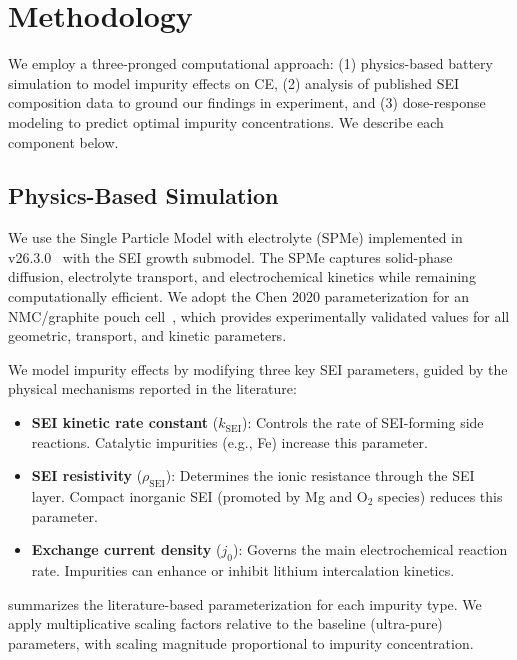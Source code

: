 \section{Methodology}
\label{sec:method}

We employ a three-pronged computational approach: (1) physics-based battery simulation to model impurity effects on CE, (2) analysis of published SEI composition data to ground our findings in experiment, and (3) dose-response modeling to predict optimal impurity concentrations. We describe each component below.

\subsection{Physics-Based Simulation}
\label{sec:simulation}

We use the Single Particle Model with electrolyte (SPMe) implemented in \pybamm v26.3.0~\citep{pybamm2020} with the SEI growth submodel. The SPMe captures solid-phase diffusion, electrolyte transport, and electrochemical kinetics while remaining computationally efficient. We adopt the Chen 2020 parameterization for an NMC/graphite pouch cell~\citep{chen2020parameterization}, which provides experimentally validated values for all geometric, transport, and kinetic parameters.

We model impurity effects by modifying three key SEI parameters, guided by the physical mechanisms reported in the literature:

\begin{itemize}[leftmargin=*,itemsep=2pt,topsep=2pt]
    \item \textbf{SEI kinetic rate constant} ($k_\text{SEI}$): Controls the rate of SEI-forming side reactions. Catalytic impurities (e.g., Fe) increase this parameter.
    \item \textbf{SEI resistivity} ($\rho_\text{SEI}$): Determines the ionic resistance through the SEI layer. Compact inorganic SEI (promoted by Mg and O$_2$ species) reduces this parameter.
    \item \textbf{Exchange current density} ($j_0$): Governs the main electrochemical reaction rate. Impurities can enhance or inhibit lithium intercalation kinetics.
\end{itemize}

 summarizes the literature-based parameterization for each impurity type. We apply multiplicative scaling factors relative to the baseline (ultra-pure) parameters, with scaling magnitude proportional to impurity concentration.

